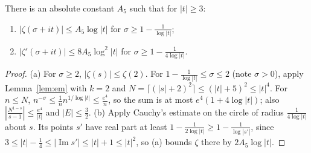 \begin{lemma}\label{lem:zetaline}
There is an absolute constant $A_5$ such that for $|t|\ge3$:
\begin{enumerate}[label=(\alph*)]
\item $|\zeta(\sigma+it)|\le A_5\log|t|$ for $\sigma\ge1-\frac1{\log|t|}$;
\item $|\zeta'(\sigma+it)|\le8A_5\log^2|t|$ for $\sigma\ge1-\frac1{4\log|t|}$.
\end{enumerate}
\end{lemma}
\begin{proof}
(a) For $\sigma\ge2$, $|\zeta(s)|\le\zeta(2)$. For $1-\frac1{\log|t|}\le\sigma\le2$ (note $\sigma>0$), apply Lemma~\ref{lem:em} with $k=2$ and $N=\lceil(|s|+2)^2\rceil\le(|t|+5)^2\le|t|^4$. For $n\le N$, $n^{-\sigma}\le\frac1nn^{1/\log|t|}\le\frac{e^4}n$, so the sum is at most $e^4(1+4\log|t|)$; also $|\frac{N^{1-s}}{s-1}|\le\frac{e^4}{|t|}$ and $|E|\le\frac32$.
(b) Apply Cauchy's estimate on the circle of radius $\frac1{4\log|t|}$ about $s$. Its points $s'$ have real part at least $1-\frac1{2\log|t|}\ge1-\frac1{\log|s'|}$, since $3\le|t|-\frac14\le|\operatorname{Im}s'|\le|t|+1\le|t|^2$, so (a) bounds $\zeta$ there by $2A_5\log|t|$.
\end{proof}

